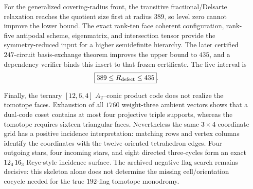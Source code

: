 For the generalized covering-radius front, the transitive
fractional/Delsarte relaxation reaches the quotient size first at radius
$389$, so level zero cannot improve the lower bound. The exact rank-ten
face coherent configuration, rank-five antipodal scheme, eigenmatrix,
and intersection tensor provide the symmetry-reduced input for a higher
semidefinite hierarchy. The later certified $247$-circuit basis-exchange
theorem improves the upper bound to $435$, and a dependency verifier
binds this insert to that frozen certificate. The live interval is
\[
\boxed{389\leq R_{\rm defect}\leq435}.
\]

Finally, the ternary $[12,6,4]$ $A_2$--conic product code does not realize
the tomotope faces. Exhaustion of all $1760$ weight-three ambient
vectors shows that a dual-code coset contains at most four projective
triple supports, whereas the tomotope requires sixteen triangular
faces. Nevertheless the same $3\times4$ coordinate grid has a positive
incidence interpretation: matching rows and vertex columns identify the
coordinates with the twelve oriented tetrahedron edges. Four outgoing
stars, four incoming stars, and eight directed three-cycles form an exact
$12_4\,16_3$ Reye-style incidence surface. The archived negative flag
search remains decisive: this skeleton alone does not determine the
missing cell/orientation cocycle needed for the true $192$-flag
tomotope monodromy.
